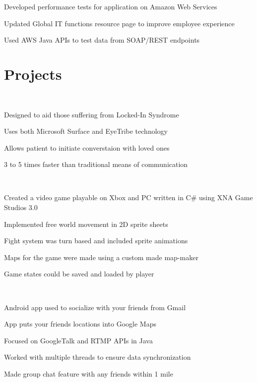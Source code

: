 \documentclass[]{deedy-resume-openfont}
\begin{document}
\begin{minipage}[t]{0.66\textwidth}
\begin{tightemize}
\item Developed performance tests for application on Amazon Web Services
\item Updated Global IT functions resource page to improve employee experience
\item Used AWS Java APIs to test data from SOAP/REST endpoints
\end{tightemize}
\sectionsep


\section{Projects}
 \\
\begin{tightemize}
\item Designed to aid those suffering from Locked-In Syndrome
\item Uses both Microsoft Surface and EyeTribe technology
\item Allows patient to initiate converstaion with loved ones
\item 3 to 5 times faster than traditional means of communication
\end{tightemize}
\sectionsep

 \\
\begin{tightemize}
\item Created a video game playable on Xbox and PC written in C\# using XNA Game Studios 3.0
\item Implemented free world movement in 2D sprite sheets
\item Fight system was turn based and included sprite animations
\item Maps for the game were made using a custom made map-maker
\item Game states could be saved and loaded by player
\end{tightemize}
\sectionsep

 \\
\begin{tightemize}
\item Android app used to socialize with your friends from Gmail
\item App puts your friends locations into Google Maps
\item Focused on GoogleTalk and RTMP APIs in Java
\item Worked with multiple threads to ensure data synchronization
\item Made group chat feature with any friends within 1 mile
\end{tightemize}
\sectionsep


\end{minipage}
\end{document}
